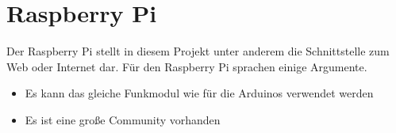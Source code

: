 \section{Raspberry Pi}
Der Raspberry Pi stellt in diesem Projekt unter anderem die Schnittstelle zum Web oder Internet dar. Für den Raspberry Pi sprachen einige Argumente.
\begin{itemize}
\item Es kann das gleiche Funkmodul wie für die Arduinos verwendet werden
\item Es ist eine große Community vorhanden
\end{itemize}